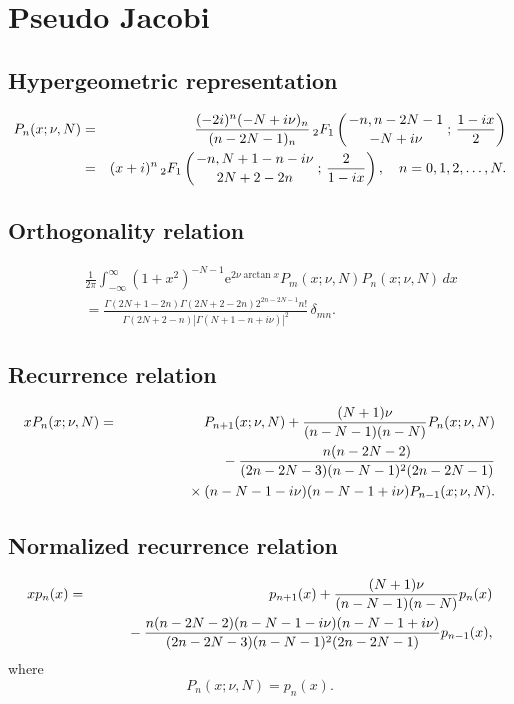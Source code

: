 \documentclass[envcountchap,graybox]{svmono}
\newcommand{\hyp}[5]{\mbox{}_{#1}{F}_{#2}
\left(\genfrac{}{}{0pt}{}{#3}{#4}\,;\,#5\right)}
\newcommand{\mathindent}{\hspace{7.5mm}}
\newcommand{\e}{\textrm{e}}
\renewcommand{\Gamma}{\varGamma}
\newcommand{\hyp}[5]{\,\mbox{}_{#1}F_{#2}\!\left(
  \genfrac{}{}{0pt}{}{#3}{#4};#5\right)}
\begin{document}
\newpage

\section{Pseudo Jacobi}

\par\setcounter{equation}{0}

\subsection*{Hypergeometric representation}
\begin{eqnarray}
\label{DefPseudoJacobi}
P_n(x;\nu,N)&=&\frac{(-2i)^n(-N+i\nu)_n}{(n-2N-1)_n}\,\hyp{2}{1}{-n,n-2N-1}{-N+i\nu}{\frac{1-ix}{2}}\\
&=&(x+i)^n\,\hyp{2}{1}{-n,N+1-n-i\nu}{2N+2-2n}{\frac{2}{1-ix}},\quad n=0,1,2,\ldots,N.\nonumber
\end{eqnarray}

\subsection*{Orthogonality relation}
\begin{eqnarray}
\label{OrtPseudoJacobi}
& &\frac{1}{2\pi}\int_{-\infty}^{\infty}(1+x^2)^{-N-1}\e^{2\nu\arctan x}P_m(x;\nu,N)P_n(x;\nu,N)\,dx\nonumber\\
& &{}=\frac{\Gamma(2N+1-2n)\Gamma(2N+2-2n)2^{2n-2N-1}n!}{\Gamma(2N+2-n)\left|\Gamma(N+1-n+i\nu)\right|^2}\,\delta_{mn}.
\end{eqnarray}

\subsection*{Recurrence relation}
\begin{eqnarray}
\label{RecPseudoJacobi}
xP_n(x;\nu,N)&=&P_{n+1}(x;\nu,N)+\frac{(N+1)\nu}{(n-N-1)(n-N)}P_n(x;\nu,N)\nonumber\\
& &{}\mathindent{}-\frac{n(n-2N-2)}{(2n-2N-3)(n-N-1)^2(2n-2N-1)}\nonumber\\
& &{}\mathindent\mathindent\times(n-N-1-i\nu)(n-N-1+i\nu)P_{n-1}(x;\nu,N).
\end{eqnarray}

\subsection*{Normalized recurrence relation}
\begin{eqnarray}
\label{NormRecPseudoJacobi}
xp_n(x)&=&p_{n+1}(x)+\frac{(N+1)\nu}{(n-N-1)(n-N)}p_n(x)\nonumber\\
& &{}\mathindent{}-\frac{n(n-2N-2)(n-N-1-i\nu)(n-N-1+i\nu)}{(2n-2N-3)(n-N-1)^2(2n-2N-1)}p_{n-1}(x),
\end{eqnarray}
where
$$P_n(x;\nu,N)=p_n(x).$$
\end{document}
